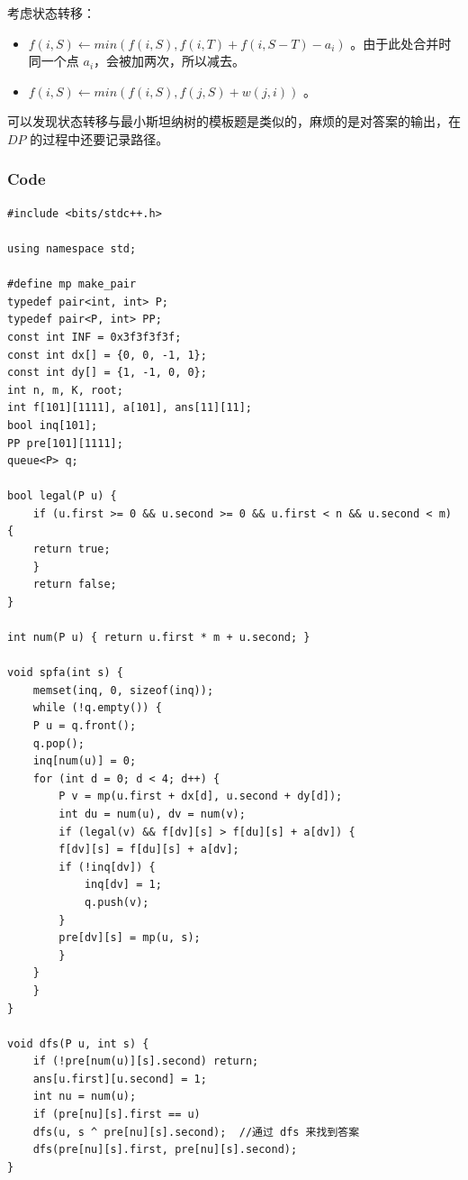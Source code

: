 \documentclass{SCIS2022cn}
\begin{document}
考虑状态转移：
\begin{itemize}
    \item $f(i,S) \leftarrow min(f(i,S),f(i,T)+f(i,S-T)-a_i)$ 。由于此处合并时同一个点 $a_i$，会被加两次，所以减去。
    \item $f(i,S) \leftarrow min(f(i,S),f(j,S)+w(j,i))$ 。
\end{itemize}

可以发现状态转移与最小斯坦纳树的模板题是类似的，麻烦的是对答案的输出，在 $DP$ 的过程中还要记录路径。

\subsubsection*{Code}

\begin{lstlisting}
#include <bits/stdc++.h>

using namespace std;

#define mp make_pair
typedef pair<int, int> P;
typedef pair<P, int> PP;
const int INF = 0x3f3f3f3f;
const int dx[] = {0, 0, -1, 1};
const int dy[] = {1, -1, 0, 0};
int n, m, K, root;
int f[101][1111], a[101], ans[11][11];
bool inq[101];
PP pre[101][1111];
queue<P> q;

bool legal(P u) {
    if (u.first >= 0 && u.second >= 0 && u.first < n && u.second < m) {
    return true;
    }
    return false;
}

int num(P u) { return u.first * m + u.second; }

void spfa(int s) {
    memset(inq, 0, sizeof(inq));
    while (!q.empty()) {
    P u = q.front();
    q.pop();
    inq[num(u)] = 0;
    for (int d = 0; d < 4; d++) {
        P v = mp(u.first + dx[d], u.second + dy[d]);
        int du = num(u), dv = num(v);
        if (legal(v) && f[dv][s] > f[du][s] + a[dv]) {
        f[dv][s] = f[du][s] + a[dv];
        if (!inq[dv]) {
            inq[dv] = 1;
            q.push(v);
        }
        pre[dv][s] = mp(u, s);
        }
    }
    }
}

void dfs(P u, int s) {
    if (!pre[num(u)][s].second) return;
    ans[u.first][u.second] = 1;
    int nu = num(u);
    if (pre[nu][s].first == u)
    dfs(u, s ^ pre[nu][s].second);  //通过 dfs 来找到答案
    dfs(pre[nu][s].first, pre[nu][s].second);
}


\end{lstlisting}
\end{document}
